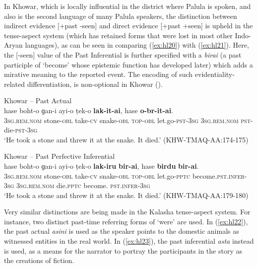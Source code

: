 \documentclass[output=paper]{langsci/langscibook}
\begin{document}
In Khowar, which is locally influential in the district where Palula is spoken, and also is the second language of many Palula speakers, the distinction between indirect evidence [+past -seen] and direct evidence [+past +seen] is upheld in the tense-aspect system (which has retained forms that were lost in most other Indo-Aryan languages), as can be seen in comparing ‎(\ref{ex:hl20}) with ‎(\ref{ex:hl21}). Here, the [-seen] value of the Past Inferential is further specified with a \textit{birai} (a past participle of ‘become’ whose epistemic function has developed later) which adds a mirative meaning to the reported event. The encoding of such evidentiality-related differentiation, is non-optional in Khowar (\citealt[221–222]{Bashir2007}).

\begin{exe}
	\ex Khowar – Past Actual \label{ex:hl20}\\
	\gll hase boht-o ɡan-i ayi-o ṭek-o \textbf{lak-it-ai}, hase \textbf{o-br-it-ai}.\\
	3\textsc{sg}.\textsc{rem}.\textsc{nom} stone-\textsc{obl} take-\textsc{cv} snake-\textsc{obl} \textsc{top}-\textsc{obl} let.go-\textsc{pst}-3\textsc{sg} 3\textsc{sg}.\textsc{rem}.\textsc{nom} \textsc{pst}-die-\textsc{pst}-3\textsc{sg}\\
	 ‘He took a stone and threw it at the snake. It died.’ (KHW-TMAQ-AA:174-175)
\end{exe}

\begin{exe}
	\ex Khowar – Past Perfective Inferential \label{ex:hl21}\\
	\gll hase boht-o ɡan-i ayi-o ṭek-o \textbf{lak-iru} \textbf{bir-ai}, hase \textbf{birdu} \textbf{bir-ai}.\\
	3\textsc{sg}.\textsc{rem}.\textsc{nom} stone-\textsc{obl} take-\textsc{cv} snake-\textsc{obl} \textsc{top}-\textsc{obl} let.go-\textsc{pptc} become.\textsc{pst}.\textsc{infer}-3\textsc{sg} 3\textsc{sg}.\textsc{rem}.\textsc{nom} die.\textsc{pptc} become. \textsc{pst}.\textsc{infer}-3\textsc{sg}\\
	 ‘He took a stone and threw it at the snake. It died.’ (KHW-TMAQ-AA:179-180) 
\end{exe}


Very similar distinctions are being made in the Kalasha tense-aspect system. For instance, two distinct past-time referring forms of ‘were’ are used. In ‎(\ref{ex:hl22}), the past actual \textit{asini} is used as the speaker points to the domestic animals as witnessed entities in the real world. In ‎(\ref{ex:hl23}), the past inferential \textit{asta} instead is used, as a means for the narrator to portray the participants in the story as the creations of fiction.
\end{document}
